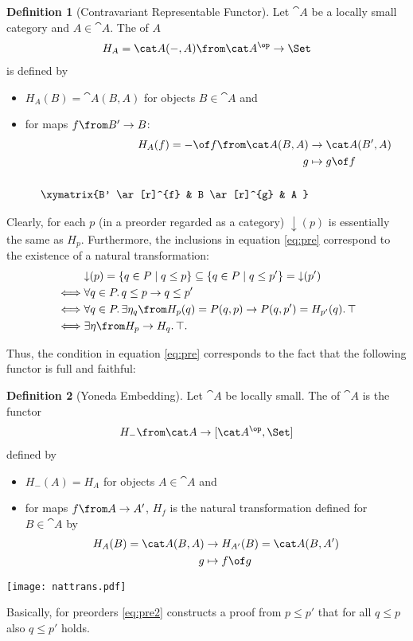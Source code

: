 \documentclass{article}
\theoremstyle{definition}
\newtheorem{definition}{Definition}
\numberwithin{equation}{section}
\begin{document}
\begin{definition}[Contravariant Representable Functor]
  Let $\cat A$ be a locally small category and $A\in \cat A$.
 The  of $A$
  \begin{align*}
    H_A=\cat A(-,A)\from \cat A^\op\to \Set
  \end{align*}
  is defined by
  \begin{itemize}
  \item $H_A(B)=\cat A(B,A)$ for objects $B\in\cat A$ and
  \item for maps $f\from B'\to B$:
    \begin{align*}
      H_A(f)=-\of f\from \cat A(B,A)&\to \cat A(B',A)\\
      g &\mapsto g\of f\\\\
      \xymatrix{B' \ar[r]^{f} & B \ar[r]^{g} & A }
    \end{align*}
  \end{itemize}
\end{definition}

Clearly, for each $p$ (in a preorder regarded as a category) ${\downarrow}(p)$ is essentially the same as $H_p$. Furthermore, the inclusions in equation \eqref{eq:pre} correspond to the existence of a natural transformation:
\begin{align*}
  &{\downarrow}(p)=\{q\in P\mid q\leq p\}\subseteq \{q\in P\mid q\leq p'\}={\downarrow}(p')\\
  \iff &\forall q\in P\ldotp q\leq p\rightarrow q\leq p'\\
  \iff &\forall q\in P\ldotp\exists \eta_q\from H_p(q)=P(q,p)\to P(q,p')=H_{p'}(q)\ldotp\top\\
  \iff&\exists \eta\from H_p\to H_q\ldotp\top.
\end{align*}

Thus, the condition in equation \eqref{eq:pre} corresponds to the fact that the following functor is full and faithful:

\begin{definition}[Yoneda Embedding]
  Let $\cat A$ be locally small. The  of $\cat A$ is the functor
  \begin{align*}
    H_-\from \cat A\to[\cat A^\op,\Set]
  \end{align*}
  defined by
  \begin{itemize}
  \item $H_-(A)=H_A$ for objects $A\in\cat A$ and
  \item for maps $f\from A\to A'$, $H_f$ is the natural transformation defined for $B\in \cat A$ by
    \begin{align}
      \label{eq:pre2}
      H_A(B)=\cat A(B,A)&\to H_{A'}(B)=\cat A(B,A')\\
      g&\mapsto  f\of g \nonumber
    \end{align}
  \end{itemize}
  \texttt{[image: nattrans.pdf]}
\end{definition}
Basically, for preorders \eqref{eq:pre2} constructs a proof from $p\leq p'$ that for all $q\leq p$ also $q\leq p'$ holds.
\end{document}
